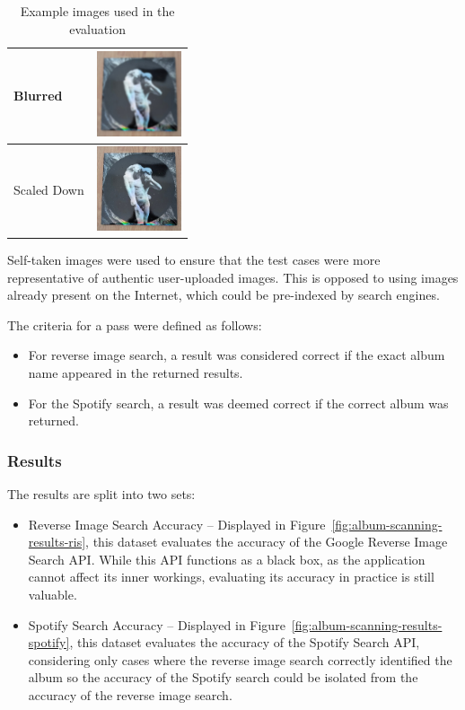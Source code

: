 \begin{table} [H]
\begin{subtable}{0.48\textwidth}
\begin{tabular}{|m{2.5cm}|m{2.5cm}|}
            \hline
 Blurred & \includegraphics[width=2.5cm]{figures/test_albums/Reflektor_Blurred.jpg} \\
            \hline
 Scaled Down & \includegraphics[width=2.5cm]{figures/test_albums/Reflektor_Scaled.jpg} \\
            \hline
        \end{tabular}
    \end{subtable}

    \caption{Example images used in the evaluation}
    \label{tab:image-evaluation-examples}
\end{table}

Self-taken images were used to ensure that the test cases were more representative of authentic user-uploaded images. This is opposed to using images already present on the Internet, which could be pre-indexed by search engines.

The criteria for a pass were defined as follows:
\begin{itemize}
    \item For reverse image search, a result was considered correct if the exact album name appeared in the returned results.
    \item For the Spotify search, a result was deemed correct if the correct album was returned.
\end{itemize}

\subsubsection{Results}
The results are split into two sets:
\begin{itemize}
    \item Reverse Image Search Accuracy – Displayed in Figure~\ref{fig:album-scanning-results-ris}, this dataset evaluates the accuracy of the Google Reverse Image Search API. While this API functions as a black box, as the application cannot affect its inner workings, evaluating its accuracy in practice is still valuable.
    \item Spotify Search Accuracy – Displayed in Figure~\ref{fig:album-scanning-results-spotify}, this dataset evaluates the accuracy of the Spotify Search API, considering only cases where the reverse image search correctly identified the album so the accuracy of the Spotify search could be isolated from the accuracy of the reverse image search.
\end{itemize}

